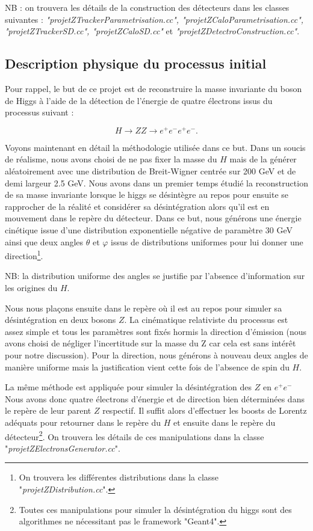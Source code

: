 \documentclass[11pt]{article}
\begin{document}
NB : on trouvera les détails de la construction des détecteurs dans les classes
suivantes : \textit{"projetZTrackerParametrisation.cc",
"projetZCaloParametrisation.cc", "projetZTrackerSD.cc", "projetZCaloSD.cc"} et 
\textit{"projetZDetectroConstruction.cc"}. 



\subsection{Description physique du processus initial}

Pour rappel, le but de ce projet est de reconstruire la masse invariante du
boson de Higgs à l'aide de la détection de l'énergie de quatre électrons issus
du processus suivant :

\begin{equation}
H \longrightarrow ZZ \longrightarrow e^+ e^- e^+ e^-.
\end{equation}

Voyons maintenant en détail la méthodologie utilisée dans ce but. Dans un
soucis de réalisme, nous avons choisi de ne pas fixer la masse du $H$ mais
de la générer aléatoirement avec une distribution de Breit-Wigner centrée sur
200 GeV et de demi largeur 2.5 GeV. Nous avons dans un premier temps étudié la reconstruction de sa masse
invariante lorsque le higgs se désintègre au repos pour ensuite se rapprocher
de la réalité et considérer sa désintégration alors qu'il est en mouvement dans
le repère du détecteur. Dans ce but, nous générons une énergie cinétique issue
d'une distribution exponentielle négative de paramètre 30 GeV ainsi que deux
angles $\theta$ et $\varphi$ issus de distributions uniformes pour lui donner
une direction\footnote{On trouvera les différentes distributions dans la classe
"\textit{projetZDistribution.cc}".}. 

NB: la distribution uniforme des angles se
justifie par l'absence d'information sur les origines du $H$. 

Nous nous plaçons
ensuite dans le repère où il est au repos pour simuler sa désintégration en deux
bosons $Z$. La cinématique relativiste du processus est assez simple et tous les
paramètres sont fixés hormis la direction d'émission (nous avons choisi de
négliger l'incertitude sur la masse du Z car cela est sans intérêt pour notre
discussion). Pour la direction, nous générons à nouveau deux angles de manière
uniforme mais la justification vient cette fois de l'absence de spin du $H$. 

La même méthode est appliquée pour simuler la désintégration des $Z$ en
$e^+e^-$ Nous avons donc quatre électrons d'énergie et de direction bien
déterminées dans le repère de leur parent $Z$ respectif. Il suffit alors
d'effectuer les boosts de Lorentz adéquats pour retourner dans le repère du $H$
et ensuite dans le repère du détecteur\footnote{Toutes ces manipulations pour
simuler la désintégration du higgs sont des algorithmes ne nécessitant pas le
framework "Geant4".}. On trouvera les détails de ces manipulations dans la
classe "\textit{projetZElectronsGenerator.cc}".
\end{document}
